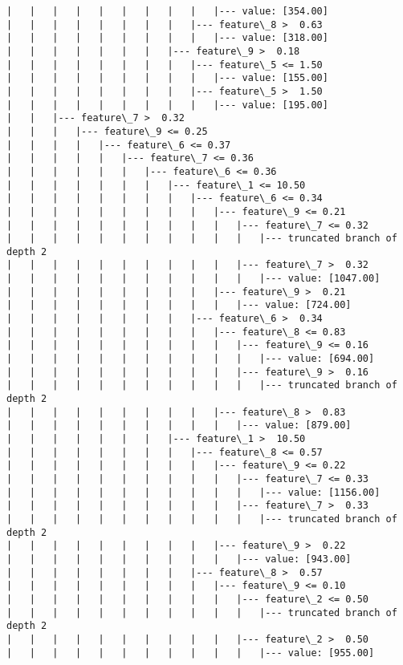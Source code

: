 \documentclass[11pt]{article}
\begin{document}
\begin{Verbatim}[commandchars=\\\{\}]
|   |   |   |   |   |   |   |   |   |--- value: [354.00]
|   |   |   |   |   |   |   |   |--- feature\_8 >  0.63
|   |   |   |   |   |   |   |   |   |--- value: [318.00]
|   |   |   |   |   |   |   |--- feature\_9 >  0.18
|   |   |   |   |   |   |   |   |--- feature\_5 <= 1.50
|   |   |   |   |   |   |   |   |   |--- value: [155.00]
|   |   |   |   |   |   |   |   |--- feature\_5 >  1.50
|   |   |   |   |   |   |   |   |   |--- value: [195.00]
|   |   |--- feature\_7 >  0.32
|   |   |   |--- feature\_9 <= 0.25
|   |   |   |   |--- feature\_6 <= 0.37
|   |   |   |   |   |--- feature\_7 <= 0.36
|   |   |   |   |   |   |--- feature\_6 <= 0.36
|   |   |   |   |   |   |   |--- feature\_1 <= 10.50
|   |   |   |   |   |   |   |   |--- feature\_6 <= 0.34
|   |   |   |   |   |   |   |   |   |--- feature\_9 <= 0.21
|   |   |   |   |   |   |   |   |   |   |--- feature\_7 <= 0.32
|   |   |   |   |   |   |   |   |   |   |   |--- truncated branch of depth 2
|   |   |   |   |   |   |   |   |   |   |--- feature\_7 >  0.32
|   |   |   |   |   |   |   |   |   |   |   |--- value: [1047.00]
|   |   |   |   |   |   |   |   |   |--- feature\_9 >  0.21
|   |   |   |   |   |   |   |   |   |   |--- value: [724.00]
|   |   |   |   |   |   |   |   |--- feature\_6 >  0.34
|   |   |   |   |   |   |   |   |   |--- feature\_8 <= 0.83
|   |   |   |   |   |   |   |   |   |   |--- feature\_9 <= 0.16
|   |   |   |   |   |   |   |   |   |   |   |--- value: [694.00]
|   |   |   |   |   |   |   |   |   |   |--- feature\_9 >  0.16
|   |   |   |   |   |   |   |   |   |   |   |--- truncated branch of depth 2
|   |   |   |   |   |   |   |   |   |--- feature\_8 >  0.83
|   |   |   |   |   |   |   |   |   |   |--- value: [879.00]
|   |   |   |   |   |   |   |--- feature\_1 >  10.50
|   |   |   |   |   |   |   |   |--- feature\_8 <= 0.57
|   |   |   |   |   |   |   |   |   |--- feature\_9 <= 0.22
|   |   |   |   |   |   |   |   |   |   |--- feature\_7 <= 0.33
|   |   |   |   |   |   |   |   |   |   |   |--- value: [1156.00]
|   |   |   |   |   |   |   |   |   |   |--- feature\_7 >  0.33
|   |   |   |   |   |   |   |   |   |   |   |--- truncated branch of depth 2
|   |   |   |   |   |   |   |   |   |--- feature\_9 >  0.22
|   |   |   |   |   |   |   |   |   |   |--- value: [943.00]
|   |   |   |   |   |   |   |   |--- feature\_8 >  0.57
|   |   |   |   |   |   |   |   |   |--- feature\_9 <= 0.10
|   |   |   |   |   |   |   |   |   |   |--- feature\_2 <= 0.50
|   |   |   |   |   |   |   |   |   |   |   |--- truncated branch of depth 2
|   |   |   |   |   |   |   |   |   |   |--- feature\_2 >  0.50
|   |   |   |   |   |   |   |   |   |   |   |--- value: [955.00]

\end{Verbatim}
\end{document}
